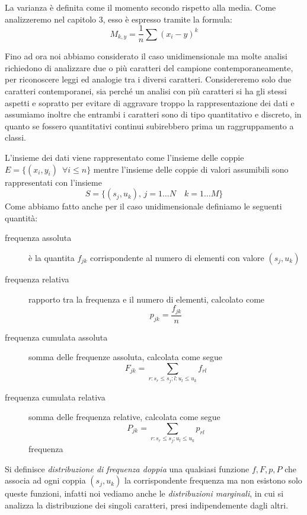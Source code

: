 \documentclass[a4paper,12pt, oneside]{book}
\begin{document}
La varianza è definita come il momento secondo rispetto alla media. Come analizzeremo nel capitolo 3,
esso è espresso tramite la formula:
\[ M_{k,y}=\frac{1}{n}\sum (x_i-y)^{k} \]

Fino ad ora noi abbiamo considerato il caso unidimensionale ma molte analisi richiedono di analizzare
due o più caratteri del campione contemporaneamente, per riconoscere leggi ed analogie tra i diversi caratteri.\newline
Considereremo solo due caratteri contemporanei, sia perché un analisi con più caratteri si ha gli stessi
aspetti e sopratto per evitare di aggravare troppo la rappresentazione dei dati e assumiamo inoltre che 
entrambi i caratteri sono di tipo quantitativo e discreto, in quanto se fossero quantitativi continui
subirebbero prima un raggruppamento a classi.

L'insieme dei dati viene rappresentato come l'insieme delle coppie $E = \{(x_i, y_i) \,\,\,\forall i \leq n\}$
mentre l'insieme delle coppie di valori assumibili sono rappresentati con l'insieme
\[ S = \{(s_j, u_k), \, j = 1 \dots N \quad k = 1 \dots M\} \]
Come abbiamo fatto anche per il caso unidimensionale definiamo le seguenti quantità:
\begin{description}
    \item [frequenza assoluta] è la quantita $f_{jk}$ corrispondente al numero di elementi con valore $(s_j, u_k)$
    \item [frequenza relativa] rapporto tra la frequenza e il numero di elementi, calcolato come 
          \[ p_{jk} = \frac{f_{jk}}{n} \]
    \item [frequenza cumulata assoluta] somma delle frequenze assoluta, calcolata come segue
           \[ F_{jk} = \sum _{r:s_r \leq s_j; l:u_l \leq u_k} f_{rl} \]
    \item [frequenza cumulata relativa] somma delle frequenza relative, calcolata come segue
           \[ P_{jk} = \sum _{r:s_r \leq s_j; u_l \leq u_k} p_{rl} \] frequenza 
\end{description}
Si definisce \emph{distribuzione di frequenza doppia} una qualsiasi funzione $f, F, p, P$ 
che associa ad ogni coppia $(s_j, u_k)$ la corrispondente frequenza ma non esistono solo queste funzioni,
infatti noi vediamo anche le \emph{distribuzioni marginali}, in cui si analizza la distribuzione dei singoli caratteri,
presi indipendemente dagli altri.
\end{document}
